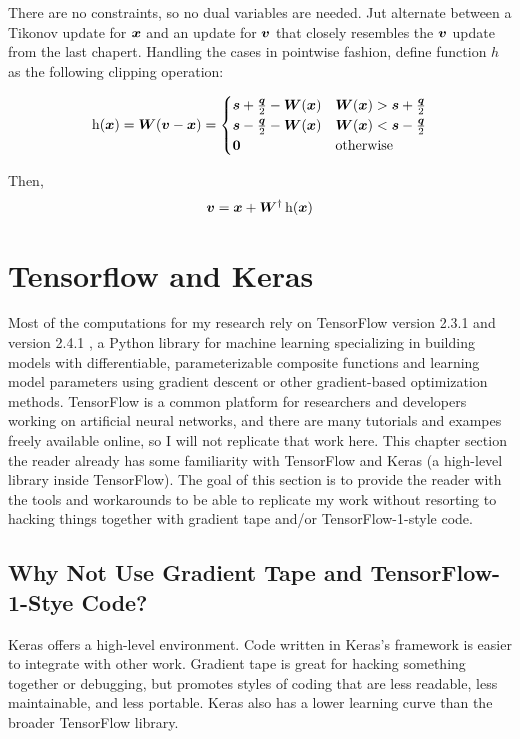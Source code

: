 There are no constraints, so no dual variables are needed. Jut alternate between a Tikonov update for $\bm{x}$ and an update for $\bm{v}$ that closely resembles the $\bm{v}$ update from the last chapert.
Handling the cases in pointwise fashion, define function $h$ as the following clipping operation:

\begin{equation}
\operatorname{h}(\bm{x}) = \bm{W}(\bm{v} - \bm{x}) = \begin{cases} \bm{s} + \frac{\bm{q}}{2} - \bm{W}(\bm{x}) & \bm{W}(\bm{x}) > \bm{s} + \frac{\bm{q}}{2} \\ \bm{s} - \frac{\bm{q}}{2} - \bm{W}(\bm{x}) & \bm{W}(\bm{x}) < \bm{s} - \frac{\bm{q}}{2} \\ \bm{0} & \text{otherwise}
\end{cases}
\end{equation}

Then,
\begin{equation}
\bm{v} = \bm{x} + \bm{W}^{\dagger}\operatorname{h}(\bm{x})
\end{equation}

\section{Tensorflow and Keras}
Most of the computations for my research rely on TensorFlow version 2.3.1 and version 2.4.1 \cite{tensorflow}, a Python library for machine learning specializing in building models with differentiable, parameterizable composite functions and learning model parameters using gradient descent or other gradient-based optimization methods. TensorFlow is a common platform for researchers and developers working on artificial neural networks, and there are many tutorials and exampes freely available online, so I will not replicate that work here. This chapter section the reader already has some familiarity with TensorFlow and Keras \cite{keras} (a high-level library inside TensorFlow). The goal of this section is to provide the reader with the tools and workarounds to be able to replicate my work without resorting to hacking things together with gradient tape and/or TensorFlow-1-style code.

\subsection{Why Not Use Gradient Tape and TensorFlow-1-Stye Code?}
Keras offers a high-level environment. Code written in Keras's framework is easier to integrate with other work. Gradient tape is great for hacking something together or debugging, but promotes styles of coding that are less readable, less maintainable, and less portable. Keras also has a lower learning curve than the broader TensorFlow library.



